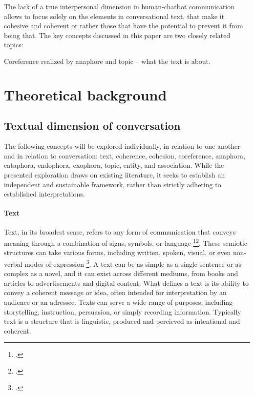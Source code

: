 \documentclass[12pt]{report}
\begin{document}
{\par
The lack of a true interpersonal dimension in human-chatbot communication
allows to focus solely on the elements in conversational text,
that make it cohesive and coherent or rather
those that have the potential to prevent it from being that.
The key concepts discussed in this paper are
two closely related topics:

Coreference realized by anaphore and topic – what the text is about.




\chapter{Theoretical background}


\section{Textual dimension of conversation}
\par
    The following concepts will be explored individually, in relation to one another and in relation to conversation: text, coherence, cohesion, coreference, anaphora, cataphora, endophora, exophora, topic, entity, and association. While the presented exploration draws on existing literature, it seeks to establish an independent and sustainable framework, rather than strictly adhering to established interpretations.

\subsubsection{Text}
\par
    Text, in its broadest sense, refers to any form of communication that conveys meaning through a combination of signs, symbols, or language \footcite[p.~7]{hrbacek1994}\footcite{hjelmslev2016}.
    These semiotic structures can take various forms, including written, spoken, visual, or even non-verbal modes of expression \footcite[p.~13]{barthes1977image}.
    A text can be as simple as a single sentence or as complex as a novel, and it can exist across different mediums, from books and articles to advertisements and digital content.
    What defines a text is its ability to convey a coherent message or idea, often intended for interpretation by an audience or an adressee.
    Texts can serve a wide range of purposes, including storytelling, instruction, persuasion, or simply recording information.
    Typically text is a structure that is
    linguistic, produced and percieved as intentional and coherent.

}
\end{document}
